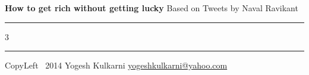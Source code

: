 \documentclass[8pt,landscape]{article}
\begin{document}
\begin{center}
     \Large{\textbf{How to get rich without getting lucky} \small{Based on Tweets by Naval Ravikant}}  %
\end{center}
\rule{\linewidth}{0.25pt}
\raggedright
\footnotesize
\begin{multicols}{3}




\rule{0.3\linewidth}{0.25pt}

\scriptsize
CopyLeft \textcopyleft\ 2014 Yogesh Kulkarni
\href{http://www.yogeshkulkarni.com}{yogeshkulkarni@yahoo.com}

\end{multicols}
\end{document}
